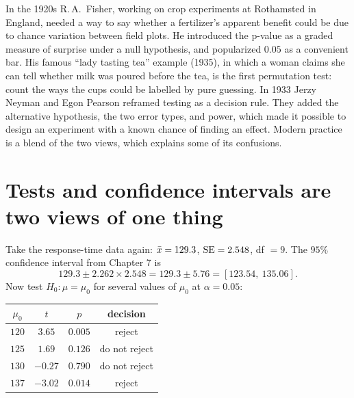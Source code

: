 \begin{historybox}
In the 1920s R.\,A.\ Fisher, working on crop experiments at Rothamsted in England,
needed a way to say whether a fertilizer's apparent benefit could be due to chance
variation between field plots. He introduced the p-value as a graded measure of
surprise under a null hypothesis, and popularized $0.05$ as a convenient bar. His
famous ``lady tasting tea'' example (1935), in which a woman claims she can tell
whether milk was poured before the tea, is the first permutation test: count the
ways the cups could be labelled by pure guessing. In 1933 Jerzy Neyman and Egon
Pearson reframed testing as a decision rule. They added the alternative hypothesis,
the two error types, and power, which made it possible to design an experiment
with a known chance of finding an effect. Modern practice is a blend of the two
views, which explains some of its confusions.
\end{historybox}

\section{Tests and confidence intervals are two views of one thing}
\label{sec:ht-duality}

Take the response-time data again: $\bar{x} = 129.3$, $\operatorname{SE} = 2.548$, df $=9$. The $95\%$
confidence interval from Chapter 7 is
\[
  129.3 \pm 2.262 \times 2.548 = 129.3 \pm 5.76 = [123.54,\ 135.06].
\]
Now test $H_0\colon\mu=\mu_0$ for several values of $\mu_0$ at $\alpha=0.05$:

\begin{center}
\begin{tabular}{cccc}
\toprule
$\mu_0$ & $t$ & $p$ & decision\\
\midrule
$120$ & $3.65$ & $0.005$ & reject\\
$125$ & $1.69$ & $0.126$ & do not reject\\
$130$ & $-0.27$ & $0.790$ & do not reject\\
$137$ & $-3.02$ & $0.014$ & reject\\
\bottomrule
\end{tabular}
\end{center}

